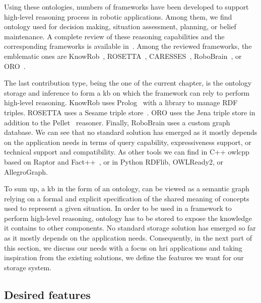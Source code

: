 Using these ontologies, numbers of frameworks have been developed to support high-level reasoning process in robotic applications. Among them, we find ontology used for decision making, situation assessment, planning, or belief maintenance. A complete review of these reasoning capabilities and the corresponding frameworks is available in~\cite{olivares_2019_review}. Among the reviewed frameworks, the emblematic ones are KnowRob~\cite{tenorth_2013_knowrob}, ROSETTA~\cite{stenmark_2013_knowledge}, CARESSES~\cite{bruno_2017_caresses}, RoboBrain~\cite{saxena_2014_robobrain}, or ORO~\cite{lemaignan_2010_oro}.

The last contribution type, being the one of the current chapter, is the ontology storage and inference to form a \acrlong{kb} on which the framework can rely to perform high-level reasoning. KnowRob uses Prolog~\cite{wielemaker_2003_prolog} with a library to manage RDF triples. ROSETTA uses a Sesame triple store~\cite{broekstra_2002_sesame}. ORO uses the Jena triple store in addition to the Pellet~\cite{sirin_2007_pellet} reasoner. Finally, RoboBrain uses a custom graph database. We can see that no standard solution has emerged as it mostly depends on the application needs in terms of query capability, expressiveness support, or technical support and compatibility. As other tools we can find in C++ owlcpp~\cite{levin_2011_owl} based on Raptor and Fact++~\cite{tsarkov_2006_fact}, or in Python RDFlib, OWLReady2, or AllegroGraph.

To sum up, a \acrlong{kb} in the form of an ontology, can be viewed as a semantic graph relying on a formal and explicit specification of the shared meaning of concepts used to represent a given situation. In order to be used in a framework to perform high-level reasoning, ontology has to be stored to expose the knowledge it contains to other components. No standard storage solution has emerged so far as it mostly depends on the application needs. Consequently, in the next part of this section, we discuss our needs with a focus on \acrlong{hri} applications and taking inspiration from the existing solutions, we define the features we want for our storage system.


\subsection{Desired features}

